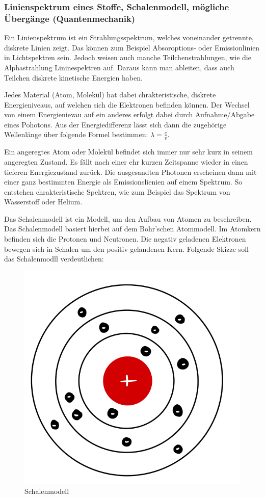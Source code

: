\documentclass{article}
\begin{document}
    \subsubsection{Linienspektrum eines Stoffe, Schalenmodell, mögliche Übergänge (Quantenmechanik)}

    \cite{chemie.de}
    \cite[1050--1051]{Physik}
    \cite{studyfix}

    Ein Linienspektrum ist ein Strahlungsspektrum, welches voneinander getrennte, diskrete Linien zeigt. Das können zum Beispiel Absoroptions- oder Emissionlinien in Lichtspektren sein. Jedoch weisen auch manche Teilchenstrahlungen, wie die Alphastrahlung Lininespektren auf. Daraus kann man ableiten, dass auch Teilchen diskrete kinetische Energien haben.

    Jedes Material (Atom, Molekül) hat dabei chrakteristische, diskrete Energieniveaus, auf welchen sich die Elektronen befinden können. Der Wechsel von einem Energienievau auf ein anderes erfolgt dabei durch Aufnahme/Abgabe eines Pohotons. Aus der Energiedifferenz lässt sich dann die zugehörige Wellenlänge über folgende Formel bestimmen: $\lambda=\frac{c}{v}$.

    Ein angeregtes Atom oder Molekül befindet sich immer nur sehr kurz in seinem angeregten Zustand. Es fällt nach einer ehr kurzen Zeitspanne wieder in einen tieferen Energiezustand zurück. Die ausgesandten Photonen erscheinen dann mit einer ganz bestimmten Energie als Emissionslienien auf einem Spektrum. So entstehen chrakteristische Spektren, wie zum Beispiel das Spektrum von Wasserstoff oder Helium.


    Das Schalenmodell ist ein Modell, um den Aufbau von Atomen zu beschreiben. Das Schalenmodell basiert hierbei auf dem Bohr'schen Atommodell. Im Atomkern befinden sich die Protonen und Neutronen. Die negativ geladenen Elektronen bewegen sich in Schalen um den positiv gelandenen Kern. Folgende Skizze soll das Schalenmodll verdeutlichen:

    \begin{figure}[H]
        \centering
        \includegraphics[width=0.3\linewidth]{Abbildungen/Schalenmodell.pdf}
        \caption{Schalenmodell}
    \end{figure}
\end{document}

